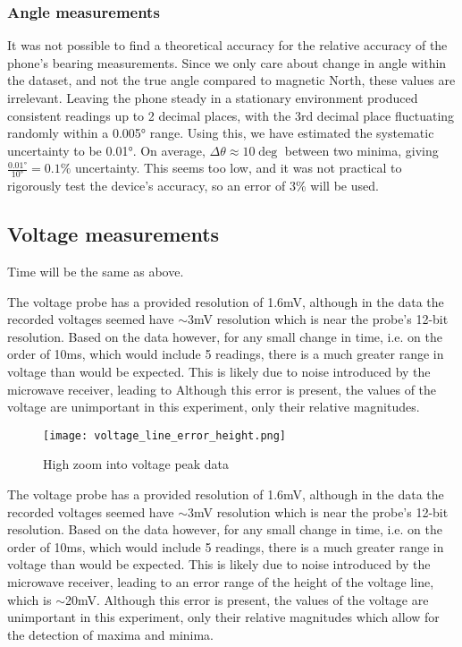 \subsubsection*{Angle measurements}

It was not possible to find a theoretical accuracy for the relative accuracy of the phone's bearing measurements. Since we only care about change in angle within the dataset, and not the true angle compared to magnetic North, these values are irrelevant. Leaving the phone steady in a stationary environment produced consistent readings up to 2 decimal places, with the 3rd decimal place fluctuating randomly within a 0.005° range. Using this, we have estimated the systematic uncertainty to be 0.01°. 
On average, $\Delta \theta \approx 10\deg$ between two minima, giving $\frac{0.01°}{10°}= 0.1\%$ uncertainty. This seems too low, and it was not practical to rigorously test the device's accuracy, so an error of 3\% will be used.

\subsection*{Voltage measurements}

Time will be the same as above.

The voltage probe has a provided resolution of 1.6mV, although in the data the recorded voltages seemed have $\sim$3mV resolution which is near the probe's 12-bit resolution.
Based on the data however, for any small change in time, i.e. on the order of 10ms, which would include 5 readings, there is a much greater range in voltage than would be expected. This is likely due to noise introduced by the microwave receiver, leading to 
 Although this error is present, the values of the voltage are unimportant in this experiment, only their relative magnitudes.

\begin{wrapfigure}{r}{0.3\textwidth}
	\centering
	\texttt{[image: voltage\_line\_error\_height.png]}
	\caption{High zoom into voltage peak data}
\end{wrapfigure} 

The voltage probe has a provided resolution of 1.6mV, although in the data the recorded voltages seemed have $\sim$3mV resolution which is near the probe's 12-bit resolution.
Based on the data however, for any small change in time, i.e. on the order of 10ms, which would include 5 readings, there is a much greater range in voltage than would be expected. This is likely due to noise introduced by the microwave receiver, leading to an error range of the height of the voltage line, which is $\sim$20mV.
 Although this error is present, the values of the voltage are unimportant in this experiment, only their relative magnitudes which allow for the detection of maxima and minima.

